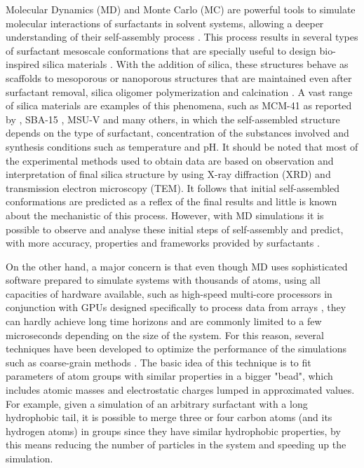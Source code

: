 \documentclass[10pt,a4paper,twoside]{article}
\begin{document}
Molecular Dynamics (MD) and Monte Carlo (MC) are powerful tools to simulate molecular interactions of surfactants in solvent systems, allowing a deeper understanding of their self-assembly process \cite{mjsilica}. This process results in several types of surfactant mesoscale conformations that are specially useful to design bio-inspired silica materials \cite{bioinsp}. With the addition of silica, these structures behave as scaffolds to mesoporous or nanoporous structures that are maintained even after surfactant removal, silica oligomer polymerization and calcination \cite{silica1}.
A vast range of silica materials are examples of this phenomena, such as MCM-41 as reported by , SBA-15 \cite{sba}, MSU-V \cite{msuv} and many others, in which the self-assembled structure depends on the type of surfactant, concentration of the substances involved and synthesis conditions such as temperature and pH. It should be noted that most of the experimental methods used to obtain data are based on observation and interpretation of final silica structure by using X-ray diffraction (XRD) and transmission electron microscopy (TEM). It follows that initial self-assembled conformations are predicted as a reflex of the final results and little is known about the mechanistic of this process. However, with MD simulations it is possible to observe and analyse these initial steps of self-assembly and predict, with more accuracy, properties and frameworks provided by surfactants \cite{lipid}.

On the other hand, a major concern is that even though MD uses sophisticated software prepared to simulate systems with thousands of atoms, using all capacities of hardware available, such as high-speed multi-core processors in conjunction with GPUs designed specifically to process data from arrays \cite{gromacs}, they can hardly achieve long time horizons and are commonly limited to a few microseconds depending on the size of the system. For this reason, several techniques have been developed to optimize the performance of the simulations such as coarse-grain methods \cite{mjsilica}. The basic idea of this technique is to fit parameters of atom groups with similar properties in a bigger "bead", which includes atomic masses and electrostatic charges lumped in approximated values. For example, given a simulation of an arbitrary surfactant with a long hydrophobic tail, it is possible to merge three or four carbon atoms (and its hydrogen atoms) in groups since they have similar hydrophobic properties, by this means reducing the number of particles in the system and speeding up the simulation. 
\end{document}

